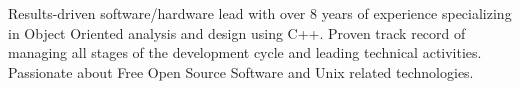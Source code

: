 

\begin{cvparagraph}

Results-driven software/hardware lead with over 8 years of experience specializing in Object Oriented analysis and design using C++. Proven track record of managing all stages of the development cycle and leading technical activities. Passionate about Free Open Source Software and Unix related technologies.

\end{cvparagraph}
